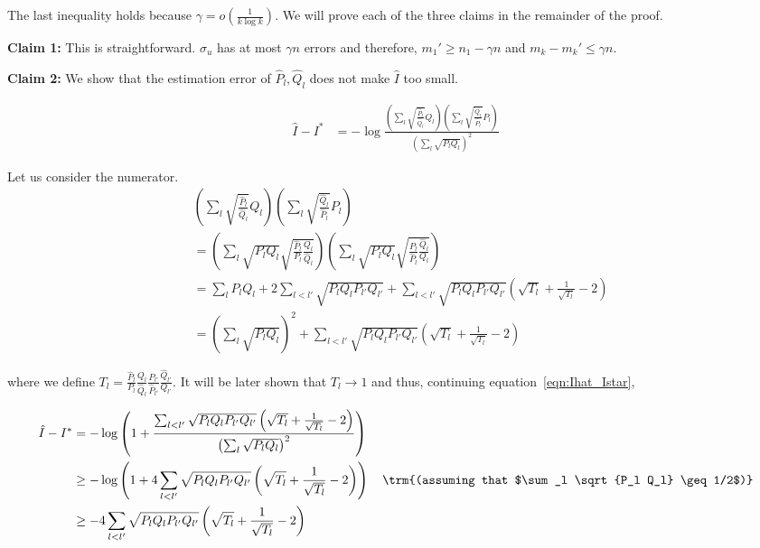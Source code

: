\documentclass{article}
\begin{document}
The last inequality holds because $\gamma = o\left( \frac{1}{k \log k} \right)$. We will prove each of the three claims in the remainder of the proof.

\textbf{Claim 1:} This is straightforward. $\sigma_u$ has at most $\gamma n$ errors and therefore, $m_1' \geq n_1 - \gamma n$ and $m_k - m_k' \leq \gamma n$. 

\textbf{Claim 2:} We show that the estimation error of $\hat{P}_l, \hat{Q}_l$ does not make $\hat{I}$ too small.

\begin{align}
\hat{I} - I^* &= - \log \frac{ 
     \left( \sum_l \sqrt{\frac{\hat{P}_l}{\hat{Q}_l}} Q_l \right)
     \left( \sum_l \sqrt{\frac{\hat{Q}_l}{\hat{P}_l}} P_l \right)}{ 
          \left( \sum_l \sqrt{P_l Q_l} \right)^2 } \label{eqn:Ihat_Istar}
\end{align}

Let us consider the numerator.
\begin{align*}
& \left( \sum_l \sqrt{ \frac{\hat{P}_l}{\hat{Q}_l}} Q_l \right)
\left( \sum_l \sqrt{ \frac{\hat{Q}_l}{\hat{P}_l}} P_l \right) \\
&= \left( \sum_l \sqrt{ P_l Q_l} \sqrt{ \frac{\hat{P}_l}{P_l} \frac{Q_l}{\hat{Q}_l}} \right) 
     \left( \sum_l \sqrt{P_l Q_l} \sqrt{ \frac{P_l}{\hat{P}_l} \frac{\hat{Q}_l}{ Q_l}} \right) \\
&= \sum_l P_l Q_l + 2\sum_{l < l'} \sqrt{P_l Q_l P_{l'} Q_{l'}} + 
   \sum_{l < l'} \sqrt{P_l Q_l P_{l'} Q_{l'}} \left( \sqrt{T_l} + \frac{1}{\sqrt{T_l}} - 2 \right) \\
&= \left( \sum_l \sqrt{P_l Q_l} \right)^2 + \sum_{l < l'} 
                  \sqrt{P_l Q_l P_{l'} Q_{l'}} \left( \sqrt{T_l} + \frac{1}{\sqrt{T_l}} - 2 \right) 
\end{align*}

where we define $T_l = \frac{\hat{P}_l}{P_l} \frac{Q_l}{\hat{Q}_l} 
      \frac{P_{l'}}{\hat{P}_{l'}} \frac{\hat{Q}_{l'}}{Q_{l'}}  $. It will be later shown that $T_l \rightarrow 1$ and thus, continuing equation~\ref{eqn:Ihat_Istar},

\begin{align}
\hat{I} - I^* &= - \log \left( 1 + \frac{ \sum_{l<l'} \sqrt{P_l Q_l P_{l'} Q_{l'}} 
    \left( \sqrt{T_l} + \frac{1}{\sqrt{T_l}} - 2 \right)}
    { \left( \sum_l \sqrt{ P_l Q_l} \right)^2 }  \right) \nonumber \\
     &  \geq  - \log \left( 1 + 4 \sum_{l<l'} \sqrt{P_l Q_l P_{l'} Q_{l'}}  
    \left( \sqrt{T_l} + \frac{1}{\sqrt{T_l}} - 2 \right)  \right) 
  \quad \trm{(assuming that $\sum_l \sqrt{P_l Q_l} \geq 1/2$)} \nonumber \\
   & \geq - 4 \sum_{l < l'} \sqrt{P_l Q_l P_{l'} Q_{l'}} 
    \left( \sqrt{T_l} + \frac{1}{\sqrt{T_l}} - 2 \right) \label{eqn:Ihat_Istar2}
\end{align}
\end{document}
